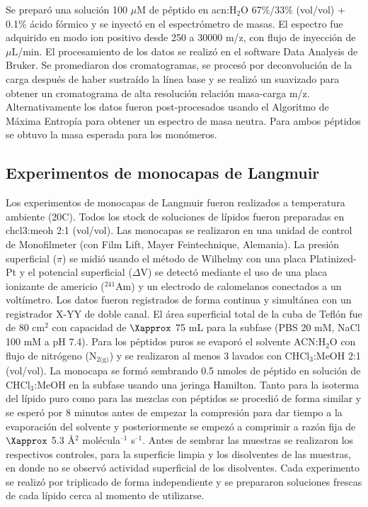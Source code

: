 Se preparó una solución 100 $\mu$M de péptido en \ac{acn}:H$_2$O 67\%/33\% (vol/vol) + 0.1\% ácido fórmico y se inyectó en el espectrómetro de masas. El espectro fue adquirido en modo ion positivo desde 250 a 30000 m/z, con flujo de inyección de $\mu$L/min. El procesamiento de los datos se realizó en el software Data Analysis de Bruker. Se promediaron dos cromatogramas, se procesó por deconvolución de la carga después de haber sustraído la línea base y se realizó un suavizado para obtener un cromatograma de alta resolución relación masa-carga m/z. Alternativamente los datos fueron post-procesados usando el Algoritmo de Máxima Entropía para obtener un espectro de masa neutra. Para ambos péptidos se obtuvo la masa esperada para los monómeros.

\subsection{Experimentos de monocapas de Langmuir}

Los experimentos de monocapas de Langmuir fueron realizados a temperatura ambiente (20\textdegree C). Todos los stock de soluciones de lípidos fueron preparadas en \ac{chcl3}:\ac{meoh} 2:1 (vol/vol). Las monocapas se realizaron en una unidad de control de Monofilmeter (con Film Lift, Mayer Feintechnique, Alemania). La presión superficial ($\pi$) se midió usando el método de Wilhelmy con una placa Platinized-Pt y el potencial superficial ($\Delta$V) se detectó mediante el uso de una placa ionizante de americio ($^{241}$Am) y un electrodo de calomelanos conectados a un voltímetro. Los datos fueron registrados de forma continua y simultánea con un registrador X-YY de doble canal. El área superficial total de la cuba de Teflón fue de 80 cm$^2$ con capacidad de $\Xapprox$ 75 mL para la subfase (PBS 20 mM, NaCl 100 mM a pH 7.4). Para los péptidos puros se evaporó el solvente ACN:H$_2$O con flujo de nitrógeno (N$_{2 \text{(g)}}$) y se realizaron al menos 3 lavados con CHCl$_3$:MeOH 2:1 (vol/vol). La monocapa se formó sembrando 0.5 nmoles de péptido en solución de CHCl$_3$:MeOH  en la subfase usando una jeringa Hamilton. Tanto para la isoterma del lípido puro como para las mezclas con péptidos se procedió de forma similar y se esperó por 8 minutos antes de empezar la compresión para dar tiempo a la evaporación del solvente y posteriormente se empezó a comprimir a razón fija de $\Xapprox$ 5.3 \AA $^{\text{2}}$ molécula$^{\text{--1}}$ s$^{\text{--1}}$. Antes de sembrar las muestras se realizaron los respectivos controles, para la superficie limpia y los disolventes de las muestras, en donde no se observó actividad superficial de los disolventes. Cada experimento se realizó por triplicado de forma independiente y se prepararon soluciones frescas de cada lípido cerca al momento de utilizarse.

